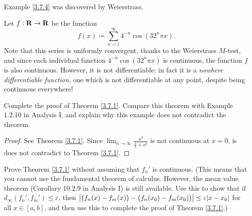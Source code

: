 \begin{note}
    Example \ref{3.7.4} was discovered by Weierstrass.
\end{note}

\begin{example}\label{3.7.4}
    Let \(f : \mathbf{R} \to \mathbf{R}\) be the function
    \[
        f(x) \coloneqq \sum_{n = 1}^\infty 4^{-n} \cos(32^n \pi x).
    \]
    Note that this series is uniformly convergent, thanks to the Weierstrass \(M\)-test, and since each individual function \(4^{-n} \cos(32^n \pi x)\) is continuous, the function \(f\) is also continuous.
    However, it is not differentiable;
    in fact it is a \emph{nowhere differentiable function}, one which is not differentiable at any point, despite being continuous everywhere!
\end{example}

\exercisesection

\begin{exercise}\label{ex 3.7.1}
    Complete the proof of Theorem \ref{3.7.1}.
    Compare this theorem with Example 1.2.10 in Analysis I, and explain why this example does not contradict the theorem.
\end{exercise}

\begin{proof}
    See Theorem \ref{3.7.1}.
    Since \(\lim_{n \to \infty} \frac{x^3}{\frac{1}{n} + x^2}\) is not continuous at \(x = 0\), is does not contradict to Theorem \ref{3.7.1}.
\end{proof}

\begin{exercise}\label{ex 3.7.2}
    Prove Theorem \ref{3.7.1} without assuming that \(f_n'\) is continuous.
    (This means that you cannot use the fundamental theorem of calculus.
    However, the mean value theorem (Corollary 10.2.9 in Analysis I) is still available.
    Use this to show that if \(d_\infty(f_n', f_m') \leq \varepsilon\), then \(\abs{\big(f_n(x) - f_m(x)\big) - \big(f_n(x_0) - f_m(x_0)\big)} \leq \varepsilon \abs{x - x_0}\) for all \(x \in [a, b]\), and then use this to complete the proof of Theorem \ref{3.7.1}.)
\end{exercise}

